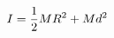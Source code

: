 \documentclass[preview]{standalone}
\begin{document}
\begin{align*}
\special{dvisvgm:raw <g id='unique000'>}I = \frac{1}{2}MR^2 + Md^2\special{dvisvgm:raw </g>}
\end{align*}
\end{document}
